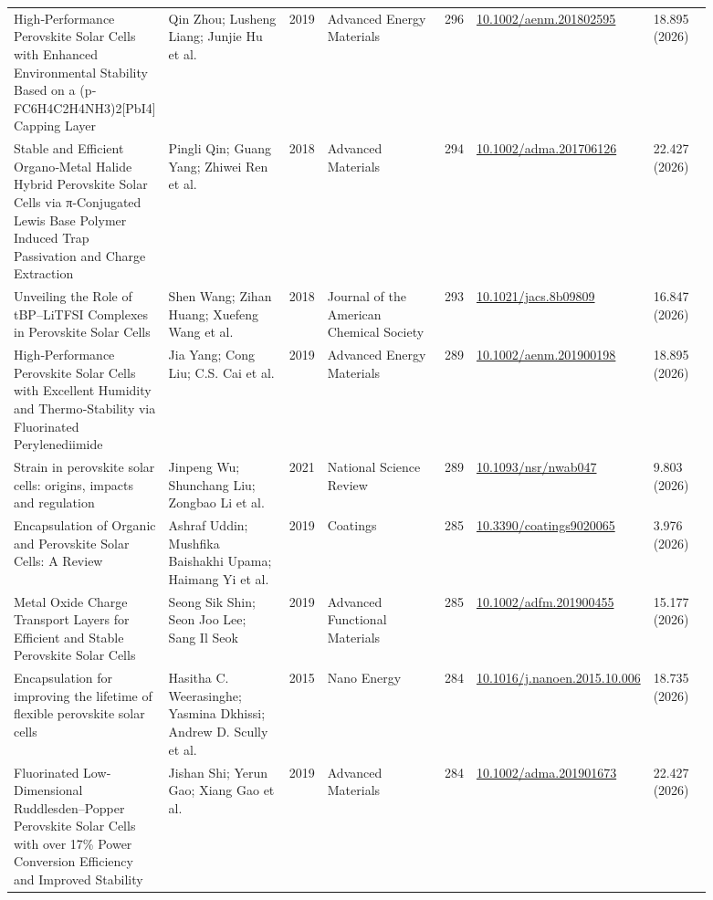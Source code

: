 \documentclass[10pt,a4paper]{article}
\begin{document}
{\begin{longtable}{p{0.197\linewidth}p{0.197\linewidth}p{0.043\linewidth}p{0.197\linewidth}p{0.043\linewidth}p{0.117\linewidth}p{0.098\linewidth}}
High‐Performance Perovskite Solar Cells with Enhanced Environmental Stability Based on a (p‐FC6H4C2H4NH3)2{[}PbI4{]} Capping Layer & Qin Zhou; Lusheng Liang; Junjie Hu et al. & 2019 & Advanced Energy Materials & 296 & \href{https://doi.org/10.1002/aenm.201802595}{10.1002/aenm.201802595} & 18.895 (2026) \\
Stable and Efficient Organo‐Metal Halide Hybrid Perovskite Solar Cells via π‐Conjugated Lewis Base Polymer Induced Trap Passivation and Charge Extraction & Pingli Qin; Guang Yang; Zhiwei Ren et al. & 2018 & Advanced Materials & 294 & \href{https://doi.org/10.1002/adma.201706126}{10.1002/adma.201706126} & 22.427 (2026) \\
Unveiling the Role of tBP–LiTFSI Complexes in Perovskite Solar Cells & Shen Wang; Zihan Huang; Xuefeng Wang et al. & 2018 & Journal of the American Chemical Society & 293 & \href{https://doi.org/10.1021/jacs.8b09809}{10.1021/jacs.8b09809} & 16.847 (2026) \\
High‐Performance Perovskite Solar Cells with Excellent Humidity and Thermo‐Stability via Fluorinated Perylenediimide & Jia Yang; Cong Liu; C.S. Cai et al. & 2019 & Advanced Energy Materials & 289 & \href{https://doi.org/10.1002/aenm.201900198}{10.1002/aenm.201900198} & 18.895 (2026) \\
Strain in perovskite solar cells: origins, impacts and regulation & Jinpeng Wu; Shunchang Liu; Zongbao Li et al. & 2021 & National Science Review & 289 & \href{https://doi.org/10.1093/nsr/nwab047}{10.1093/nsr/nwab047} & 9.803 (2026) \\
Encapsulation of Organic and Perovskite Solar Cells: A Review & Ashraf Uddin; Mushfika Baishakhi Upama; Haimang Yi et al. & 2019 & Coatings & 285 & \href{https://doi.org/10.3390/coatings9020065}{10.3390/coatings9020065} & 3.976 (2026) \\
Metal Oxide Charge Transport Layers for Efficient and Stable Perovskite Solar Cells & Seong Sik Shin; Seon Joo Lee; Sang Il Seok & 2019 & Advanced Functional Materials & 285 & \href{https://doi.org/10.1002/adfm.201900455}{10.1002/adfm.201900455} & 15.177 (2026) \\
Encapsulation for improving the lifetime of flexible perovskite solar cells & Hasitha C. Weerasinghe; Yasmina Dkhissi; Andrew D. Scully et al. & 2015 & Nano Energy & 284 & \href{https://doi.org/10.1016/j.nanoen.2015.10.006}{10.1016/j.nanoen.2015.10.006} & 18.735 (2026) \\
Fluorinated Low‐Dimensional Ruddlesden–Popper Perovskite Solar Cells with over 17\% Power Conversion Efficiency and Improved Stability & Jishan Shi; Yerun Gao; Xiang Gao et al. & 2019 & Advanced Materials & 284 & \href{https://doi.org/10.1002/adma.201901673}{10.1002/adma.201901673} & 22.427 (2026) \\

\end{longtable}}
\end{document}

